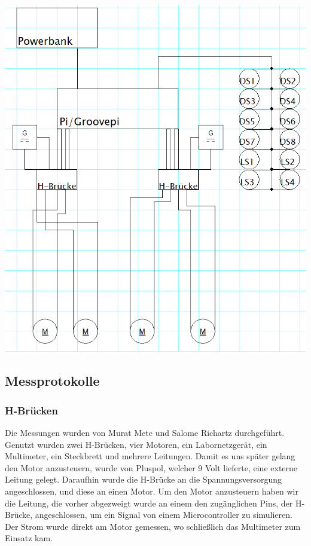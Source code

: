 \documentclass[notitlepage]{report}
\begin{document}
\includegraphics[scale=0.5]{1.png}

\subsection{Messprotokolle}

\subsubsection{H-Br\"{u}cken}
Die Messungen wurden von Murat Mete und Salome Richartz durchgef\"{u}hrt. Genutzt wurden zwei H-Br\"{u}cken, vier Motoren, ein Labornetzger\"{a}t, ein Multimeter, ein Steckbrett und mehrere Leitungen. Damit es uns sp\"{a}ter gelang den Motor anzusteuern, wurde von Pluspol, welcher 9 Volt lieferte, eine externe Leitung gelegt. Daraufhin wurde die H-Br\"{u}cke an die Spannungsversorgung angeschlossen, und diese an einen Motor. Um den Motor anzusteuern haben wir die Leitung, die vorher abgezweigt wurde an einem den zug\"{a}nglichen Pins, der H-Br\"{u}cke, angeschlossen, um ein Signal von einem Microcontroller zu simulieren. Der Strom wurde direkt am Motor gemessen, wo schlie{\ss}lich das Multimeter zum Einsatz kam.
\end{document}
